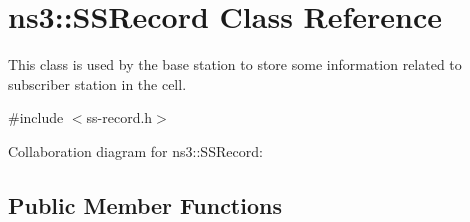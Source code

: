 \hypertarget{classns3_1_1SSRecord}{}\section{ns3\+:\+:S\+S\+Record Class Reference}
\label{classns3_1_1SSRecord}


This class is used by the base station to store some information related to subscriber station in the cell.  




{\ttfamily \#include $<$ss-\/record.\+h$>$}



Collaboration diagram for ns3\+:\+:S\+S\+Record\+:
\subsection*{Public Member Functions}
